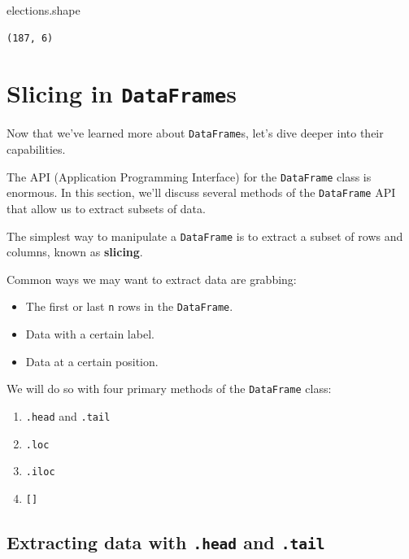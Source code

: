 \documentclass[
  letterpaper,
  DIV=11,
  numbers=noendperiod]{scrreprt}
\newenvironment{Shaded}{\begin{snugshade}}{\end{snugshade}}
\newcommand{\NormalTok}[1]{\textcolor[rgb]{0.00,0.23,0.31}{#1}}
\providecommand{\tightlist}{%
  \setlength{\itemsep}{0pt}\setlength{\parskip}{0pt}}\usepackage{longtable,booktabs,array}
\begin{document}
\begin{Shaded}
\begin{Highlighting}[]
\NormalTok{elections.shape}
\end{Highlighting}
\end{Shaded}

\begin{verbatim}
(187, 6)
\end{verbatim}

\section{\texorpdfstring{Slicing in
\texttt{DataFrame}s}{Slicing in DataFrames}}\label{slicing-in-dataframes}

Now that we've learned more about \texttt{DataFrame}s, let's dive deeper
into their capabilities.

The API (Application Programming Interface) for the \texttt{DataFrame}
class is enormous. In this section, we'll discuss several methods of the
\texttt{DataFrame} API that allow us to extract subsets of data.

The simplest way to manipulate a \texttt{DataFrame} is to extract a
subset of rows and columns, known as \textbf{slicing}.

Common ways we may want to extract data are grabbing:

\begin{itemize}
\tightlist
\item
  The first or last \texttt{n} rows in the \texttt{DataFrame}.
\item
  Data with a certain label.
\item
  Data at a certain position.
\end{itemize}

We will do so with four primary methods of the \texttt{DataFrame} class:

\begin{enumerate}
\def\labelenumi{\arabic{enumi}.}
\tightlist
\item
  \texttt{.head} and \texttt{.tail}
\item
  \texttt{.loc}
\item
  \texttt{.iloc}
\item
  \texttt{{[}{]}}
\end{enumerate}

\subsection{\texorpdfstring{Extracting data with \texttt{.head} and
\texttt{.tail}}{Extracting data with .head and .tail}}\label{extracting-data-with-.head-and-.tail}
\end{document}
